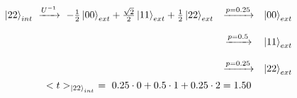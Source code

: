 \documentclass[12pt]{article}
\begin{document}
\begin{equation}
\begin{matrix}
\ket{22}_{int} \ \xrightarrow{U^{-1}} \ -\frac{1}{2}\ket{00}_{ext} + \frac{\sqrt{2}}{2}\ket{11}_{ext} + \frac{1}{2}\ket{22}_{ext} 
& \xrightarrow{p = 0.25} & \ket{00}_{ext} \\ \\
& \xrightarrow{p = 0.5} & \ket{11}_{ext} \\ \\
& \xrightarrow{p = 0.25} & \ket{22}_{ext}
\end{matrix}
\end{equation}
\begin{equation}
<t>_{\ket{22}_{int}} \ = \  0.25 \cdot 0 + 0.5 \cdot 1 + 0.25 \cdot 2 = 1.50
\end{equation}
\end{document}
